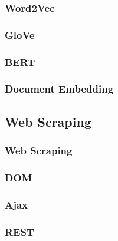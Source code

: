 \subsubsection{Word2Vec}
\subsubsection{GloVe}
\subsubsection{BERT}
\subsubsection{Document Embedding}

\subsection{Web Scraping}
\subsubsection{Web Scraping}
\subsubsection{DOM}
\subsubsection{Ajax}
\subsubsection{REST}
